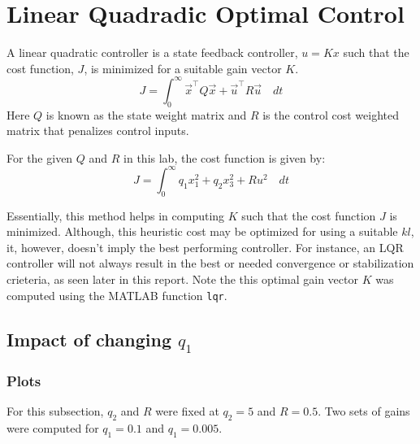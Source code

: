 \documentclass[10pt]{article}
\begin{document}
\section{Linear Quadradic Optimal Control}
A linear quadratic controller is a state feedback controller, $u = Kx$ such that the cost function, $J$, is minimized for a suitable gain vector $K$.
\begin{equation}
    J = \int_{0}^{\infty} \vec{x}^\intercal Q\vec{x} + \vec{u}^\intercal R\vec{u} \quad dt
\end{equation}
Here $Q$ is known as the state weight matrix and $R$ is the control cost weighted matrix  that penalizes control inputs.

For the given $Q$ and $R$ in this lab, the cost function is given by:
\begin{equation} \label{eqn_lqr}
    J = \int_{0}^{\infty} q_1x_1^2 + q_2x_3^2 + Ru^2 \quad dt
\end{equation}

Essentially, this method helps in computing $K$ such that the cost function $J$ is minimized. Although, this heuristic cost may be optimized for using a suitable $kl$, it, however, doesn't imply the best performing controller. For instance, an LQR controller will not always result in the best or needed convergence or stabilization crieteria, as seen later in this report. Note the this optimal gain vector $K$ was computed using the \textsc{MATLAB} function \texttt{lqr}.

\subsection{Impact of changing \texorpdfstring{$q_1$}{q1}}
\subsubsection{Plots}
For this subsection, $q_2$ and $R$ were fixed at $q_2 = 5$ and $R = 0.5$. Two sets of gains were computed for $q_1 = 0.1$ and $q_1 = 0.005$.
\end{document}
